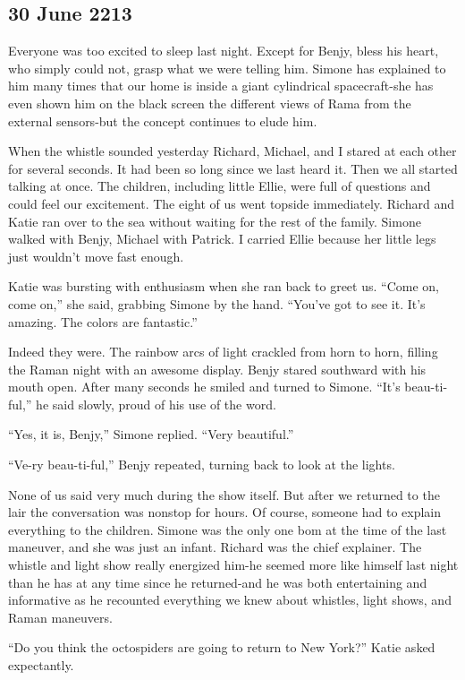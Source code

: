 \documentclass[]{article}
\begin{document}
{\subsection{30 June 2213}

Everyone was too excited to sleep last night. Except for Benjy, bless his heart, who simply could not, grasp what we were telling him. Simone has explained to him many times that our home is inside a giant cylindrical spacecraft-she has even shown him on the black screen the different views of Rama from the external sensors-but the concept continues to elude him.

When the whistle sounded yesterday Richard, Michael, and I stared at each other for several seconds. It had been so long since we last heard it. Then we all started talking at once. The children, including little Ellie, were full of questions and could feel our excitement. The eight of us went topside immediately. Richard and Katie ran over to the sea without waiting for the rest of the family. Simone walked with Benjy, Michael with Patrick. I carried Ellie because her little legs just wouldn’t move fast enough.

Katie was bursting with enthusiasm when she ran back to greet us. “Come on, come on,” she said, grabbing Simone by the hand. “You’ve got to see it. It’s amazing. The colors are fantastic.”

Indeed they were. The rainbow arcs of light crackled from horn to horn, filling the Raman night with an awesome display. Benjy stared southward with his mouth open. After many seconds he smiled and turned to Simone. “It’s beau-ti-ful,” he said slowly, proud of his use of the word.

“Yes, it is, Benjy,” Simone replied. “Very beautiful.”

“Ve-ry beau-ti-ful,” Benjy repeated, turning back to look at the lights.

None of us said very much during the show itself. But after we returned to the lair the conversation was nonstop for hours. Of course, someone had to explain everything to the children. Simone was the only one bom at the time of the last maneuver, and she was just an infant. Richard was the chief explainer. The whistle and light show really energized him-he seemed more like himself last night than he has at any time since he returned-and he was both entertaining and informative as he recounted everything we knew about whistles, light shows, and Raman maneuvers.

“Do you think the octospiders are going to return to New York?” Katie asked expectantly.

}
\end{document}
